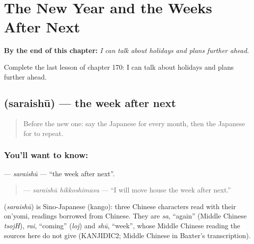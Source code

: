 
\chapter{The New Year and the Weeks After Next}
\label{ch:ja-the-new-year-and-the-weeks-after-next}

\begin{chapteropening}
\textbf{By the end of this chapter:} \emph{I can talk about holidays and plans further ahead.}

Complete the last lesson of chapter 170: I can talk about holidays and plans further ahead.
\end{chapteropening}

\section[\texorpdfstring{\ja{さらいしゅう} (saraishū)}{さらいしゅう (saraishū)}]{ (saraishū) — the week after next}

\label{lesson:JA-C170-saraishuu}



\begin{quote}
Before the new one: say the Japanese for every month, then the Japanese for to repeat.
\end{quote}

\subsection*{You'll want to know: }
\textbf{} — \emph{saraishū} — \textquotedblleft{}the week after next\textquotedblright{}.

\begin{quote}
\textbf{ } — \emph{saraishū hikkoshimasu} — \textquotedblleft{}I will move house the week after next.\textquotedblright{}
\end{quote}

\begin{cousinweb}
\textbf{} (\emph{saraishū}) is Sino-Japanese (kango): three Chinese characters read with their on'yomi, readings borrowed from Chinese. They are \emph{sa}, \textquotedblleft{}again\textquotedblright{} (Middle Chinese \emph{tsojH}), \emph{rai}, \textquotedblleft{}coming\textquotedblright{} (\emph{loj}) and \emph{shū}, \textquotedblleft{}week\textquotedblright{}, whose Middle Chinese reading the sources here do not give (KANJIDIC2; Middle Chinese in Baxter's transcription).
\end{cousinweb}

